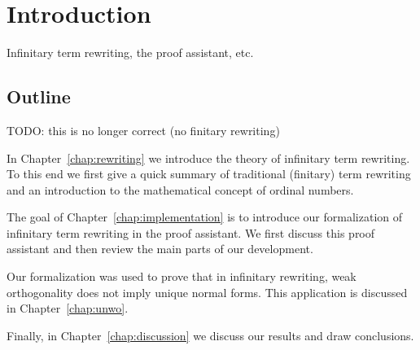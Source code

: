 \chapter{Introduction}
\setcounter{page}{1}

Infinitary term rewriting, the \Coq proof assistant, etc.


\section*{Outline}

TODO: this is no longer correct (no finitary rewriting)

In Chapter~\ref{chap:rewriting} we introduce the theory of infinitary term
rewriting. To this end we first give a quick summary of traditional (finitary)
term rewriting and an introduction to the mathematical concept of ordinal
numbers.

The goal of Chapter~\ref{chap:implementation} is to introduce our formalization
of infinitary term rewriting in the \Coq proof assistant. We first discuss this
proof assistant and then review the main parts of our development.

Our formalization was used to prove that in infinitary rewriting, weak
orthogonality does not imply unique normal forms. This application is
discussed in Chapter~\ref{chap:unwo}.

Finally, in Chapter~\ref{chap:discussion} we discuss our results and draw
conclusions.

